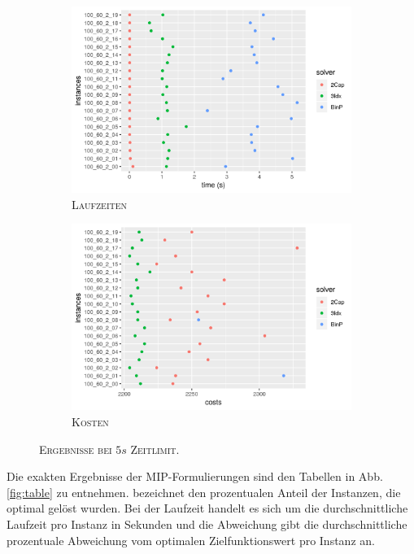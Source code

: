 \begin{figure}[H]
\centering
\begin{subfigure}[b]{0.4\textwidth}
\centering
\includegraphics[width=1.3\textwidth]{img/solver_instance_time_b=2_s_5s.png}
\caption{\textsc{Laufzeiten}}
\label{fig:b=2_s_runtimes}
\end{subfigure}
\hfill
\begin{subfigure}[b]{0.4\textwidth}
\centering
\includegraphics[width=1.3\textwidth]{img/solver_instance_cost_b=2_s_5s.png}
\caption{\textsc{Kosten}}
\label{fig:b=2_s_costs}
\end{subfigure}
\caption{\textsc{Ergebnisse bei $5s$ Zeitlimit}.}
\end{figure}

Die exakten Ergebnisse der MIP-Formulierungen sind den Tabellen in Abb. \ref{fig:table} zu entnehmen.
 bezeichnet den prozentualen Anteil der Instanzen, die optimal gelöst wurden. Bei der Laufzeit handelt
es sich um die durchschnittliche Laufzeit pro Instanz in Sekunden und die Abweichung gibt die durchschnittliche prozentuale Abweichung
vom optimalen Zielfunktionswert pro Instanz an.

